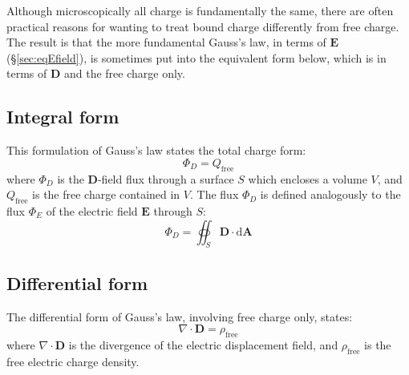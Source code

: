 \documentclass[a4paper, 12pt]{article}
\begin{document}
Although microscopically all charge is fundamentally the same, there are often practical reasons for wanting to treat bound charge differently from free charge. The result is that the more fundamental Gauss's law, in terms of \(\mathbf{E}\) (\S\ref{sec:eqEfield}), is sometimes put into the equivalent form below, which is in terms of \(\mathbf{D}\) and the free charge only.

\subsection{Integral form}
This formulation of Gauss's law states the total charge form: 
\[
    \Phi_D = Q_\text{free}
\]
where \(\Phi_D\) is the \(\mathbf{D}\)-field flux through a surface \(S\) which encloses a volume \(V\), and \(Q_\text{free}\) is the free charge contained in \(V\). The flux \(\Phi_D\) is defined analogously to the flux \(\Phi_E\) of the electric field \(\mathbf{E}\) through \(S\): 
\[
    \Phi_D = \oiint_S \mathbf{D} \cdot \mathrm{d} \mathbf{A}
\]

\subsection{Differential form}
The differential form of Gauss's law, involving free charge only, states: 
\[
    \nabla \cdot \mathbf{D} = \rho_\text{free}
\]
where \(\nabla \cdot \mathbf{D}\) is the divergence of the electric displacement field, and \(\rho_\text{free}\) is the free electric charge density. 
\end{document}
